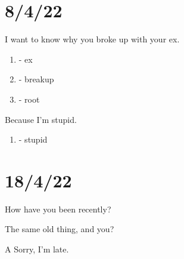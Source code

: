 \documentclass{article}
\begin{document}
\section*{8/4/22}

I want to know why you broke up with your ex.

\begin{enumerate}
    \item {} - ex
        \item {} - breakup
    \item {} - root
\end{enumerate}


Because I'm stupid.

\begin{enumerate}
    \item {} - stupid
\end{enumerate}

\section*{18/4/22}
How have you been recently?

The same old thing, and you?

A
Sorry, I'm late.
\xpinyin*{}
\xpinyin*{}
\end{document}
